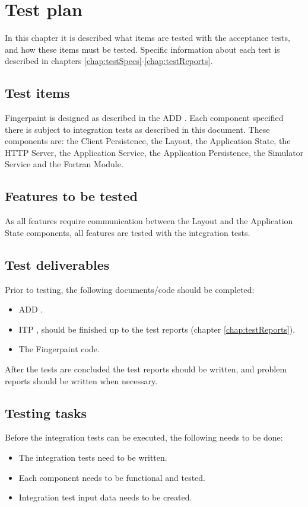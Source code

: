 \chapter{Test plan}
\label{chap:testPlan}
In this chapter it is described what items are tested with the acceptance tests, and how these items must be tested. Specific information about each test is described in chapters \ref{chap:testSpecs}-\ref{chap:testReports}.

\section{Test items}
Fingerpaint is designed as described in the ADD \cite{add}. Each component specified there is subject to integration tests as described in this document. These components are: the Client Persistence, the Layout, the Application State, the HTTP Server, the Application Service, the Application Persistence, the Simulator Service and the Fortran Module.

\section{Features to be tested}
As all features require communication between the Layout and the Application State components, all features are tested with the integration tests.

\section{Test deliverables}
Prior to testing, the following documents/code should be completed:
\begin{itemize}
\item ADD \cite{add}.
\item ITP \cite{itp}, should be finished up to the test reports (chapter \ref{chap:testReports}).
\item The Fingerpaint code.
\end{itemize}
After the tests are concluded the test reports should be written, and problem reports should be written when necessary.

\section{Testing tasks}
Before the integration tests can be executed, the following needs to be done:
\begin{itemize}
\item The integration tests need to be written.
\item Each component needs to be functional and tested.
\item Integration test input data needs to be created.
\end{itemize}

